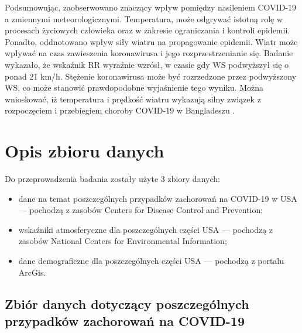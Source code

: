 \documentclass[polish, twoside, 12pt, a4paper]{article}
\theoremstyle{definition}
\theoremstyle{plain}
\theoremstyle{remark}
\begin{document}
Podsumowując, zaobserwowano znaczący wpływ pomiędzy nasileniem COVID-19 a zmiennymi meteorologicznymi. Temperatura, może odgrywać istotną rolę w procesach życiowych człowieka oraz w zakresie ograniczania i kontroli epidemii. Ponadto, oddnotowano wpływ siły wiatru na propagowanie epidemii. Wiatr może wpływać na czas zawieszenia koronawirusa i jego rozprzestrzenianie się. Badanie wykazało, że wskaźnik RR wyraźnie wzrósł, w czasie gdy WS podwyższył się o ponad 21 km/h. Stężenie koronawirusa może być rozrzedzone przez podwyższony WS, co może stanowić prawdopodobne wyjaśnienie tego wyniku. Można wnioskować, iż temperatura i prędkość wiatru wykazują silny związek z rozpoczęciem i przebiegiem choroby COVID-19 w Bangladeszu \cite{hasanuzzaman2020}.



\clearpage
\section{Opis zbioru danych}
\label{chapter:data-set}


Do przeprowadzenia badania zostały użyte 3 zbiory danych: 
\begin{itemize}[noitemsep]
  \item dane na temat poszczególnych przypadków zachorowań na COVID-19 w USA --- pochodzą z zasobów Centers for Disease Control and Prevention;
  \item wskaźniki atmosferyczne dla poszczególnych części USA --- pochodzą z zasobów National Centers for Environmental Information;
  \item dane demograficzne  dla poszczególnych części USA --- pochodzą z portalu ArcGis.
\end{itemize}

\subsection{Zbiór danych dotyczący poszczególnych przypadków zachorowań na COVID-19}
\end{document}
